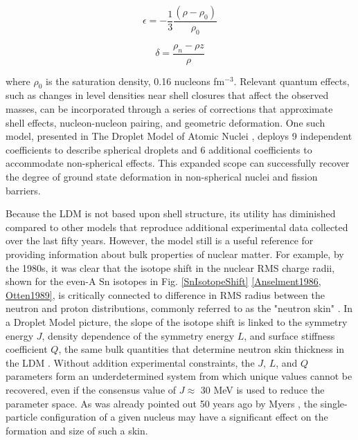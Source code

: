 \begin{equation}
    \epsilon = -\frac{1}{3}\frac{(\rho - \rho_{0})}{\rho_{0}}
\end{equation}

\begin{equation}
    \delta = \frac{\rho_{n}-\rho{z}}{\rho}
\end{equation}

where $\rho_{0}$ is the saturation density, 0.16 nucleons fm$^{-3}$. Relevant quantum
effects, such as changes in level densities near shell closures
that affect the observed masses, can be incorporated through a series of corrections
that approximate shell effects, nucleon-nucleon pairing, and geometric deformation.
One such model, presented in The Droplet Model of Atomic Nuclei
\cite{MyersAndSwiatecki}, deploys 9 
independent coefficients to describe spherical droplets and 6 additional
coefficients to accommodate non-spherical effects. This expanded scope
can successfully recover the degree of ground state deformation in non-spherical
nuclei and fission barriers.

Because the LDM is not based upon shell structure, its utility has diminished
compared to other models that reproduce additional experimental data collected
over the last fifty years. However, the model still is a useful reference for providing 
information about bulk properties of nuclear matter. For example, by the 1980s,
it was clear that the isotope shift in the nuclear RMS
charge radii, shown for the even-A Sn isotopes in Fig.
\ref{SnIsotopeShift} \ref{Anselment1986, Otten1989},
is critically connected to difference in RMS radius 
between the neutron and proton distributions, commonly referred to as the
"neutron skin" \cite{Wilkinson1967}.
In a Droplet Model picture, the slope of the isotope shift is linked to the symmetry energy $J$, 
density dependence of the symmetry energy
$L$, and surface stiffness coefficient $Q$, the same bulk quantities that determine
neutron skin thickness in the LDM \cite{Myers1969, MyersAndSwiatecki, Berdichevsky1988}.
Without addition experimental constraints, the $J$, $L$, and $Q$ parameters form an
underdetermined system from which unique values cannot be recovered, even if the
consensus value of $J \approx$ 30 MeV is used to reduce the parameter space.
As was already pointed out 50 years ago by Myers \cite{Myers1969},
the single-particle configuration of a given nucleus may have a significant
effect on the formation and size of such a skin.

